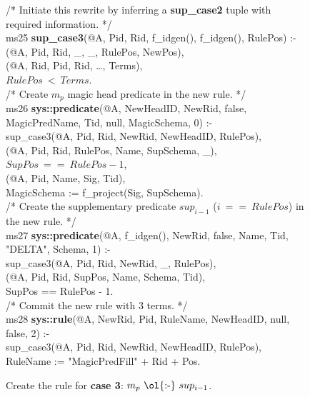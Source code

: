 \begin{figure}[!t]
\ssp
\centering
\begin{boxedminipage}{\linewidth}
/* Initiate this rewrite by inferring a {\bf sup\_case2} tuple with required information. */ \\
ms25 {\bf sup\_case3}(@A, Pid, Rid, f\_idgen(), f\_idgen(), RulePos) :- \\
(@A, Pid, Rid, \_, \_, RulePos, NewPos), \\
(@A, Rid, Pid, Rid, \ldots, Terms), \\
\datalogspace $RulePos\ <\ Terms$. \\
	
/* Create $m_p$ magic head predicate in the new rule. */ \\
ms26 {\bf sys::predicate}(@A, NewHeadID, NewRid, false, MagicPredName, Tid, null, MagicSchema, 0) :- \\
\datalogspace sup\_case3(@A, Pid, Rid, NewRid, NewHeadID, RulePos), \\
(@A, Pid, Rid, RulePos, Name, SupSchema, \_), \\
\datalogspace $SupPos\ ==\ RulePos - 1$, \\
(@A, Pid, Name, Sig, Tid), \\
\datalogspace MagicSchema := f\_project(Sig, SupSchema).\\
	
/* Create the supplementary predicate $sup_{i-1}$ ($i\ ==\ RulePos$) in the new rule. */ \\
ms27 {\bf sys::predicate}(@A, f\_idgen(), NewRid, false, Name, Tid, "DELTA", Schema, 1) :- \\
\datalogspace sup\_case3(@A, Pid, Rid, NewRid, \_, RulePos), \\
(@A, Pid, Rid, SupPos, Name, Schema, Tid), \\
\datalogspace SupPos == RulePos - 1. \\

/* Commit the new rule with $3$ terms. */ \\
ms28 {\bf sys::rule}(@A, NewRid, Pid, RuleName, NewHeadID, null, false, 2) :- \\
\datalogspace sup\_case3(@A, Pid, Rid, NewRid, NewHeadID, RulePos), \\
\datalogspace RuleName := "MagicPredFill" + Rid + Pos.

\end{boxedminipage}
\caption{\label{ch:magic:fig:rewrite6} 
Create the rule for {\bf case 3}: $m_p\ \text{\ol{:-}}\ sup_{i-1}$. } 
\end{figure}

